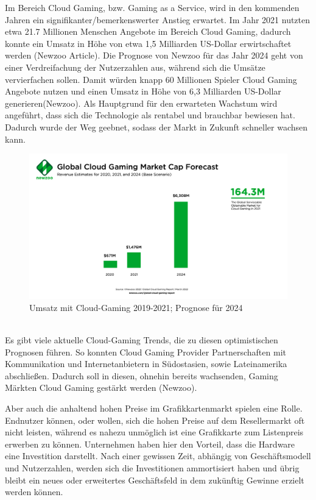\documentclass[12pt,toc=bib,toc=listof]{scrreprt}
\begin{document}
Im Bereich Cloud Gaming, bzw. Gaming as a Service, wird in den kommenden Jahren ein signifikanter/bemerkenswerter
 Anstieg erwartet. Im Jahr 2021 nutzten etwa 21.7 Millionen Menschen Angebote im Bereich Cloud Gaming, dadurch konnte ein
 Umsatz in Höhe von etwa 1,5 Milliarden US-Dollar erwirtschaftet werden (Newzoo Article). Die Prognose von Newzoo für das Jahr 
 2024 geht von einer Verdreifachung der Nutzerzahlen aus, während sich die Umsätze vervierfachen sollen. Damit würden knapp 60
 Millionen Spieler Cloud Gaming Angebote nutzen und einen Umsatz in Höhe von 6,3 Milliarden US-Dollar generieren(Newzoo). Als Hauptgrund für den erwarteten Wachstum wird angeführt, dass sich die Technologie als rentabel und brauchbar bewiesen hat. Dadurch wurde der Weg geebnet, sodass 
 der Markt in Zukunft schneller wachsen kann.
\\%
\begin{figure}[h]
 \centering
  \includegraphics[scale=0.12]{Abbildungen/Newzoo_Global_Cloud_Gaming_Market_Cap_Forecast_March2022.png} 
  \caption[Newzoo]{Umsatz mit Cloud-Gaming 2019-2021; Prognose für 2024}
\end{figure}
\\%

Es gibt viele aktuelle Cloud-Gaming Trends, die zu diesen optimistischen Prognosen führen. So konnten Cloud Gaming Provider 
Partnerschaften mit Kommunikation und Internetanbietern in Südostasien, sowie Lateinamerika abschließen. Dadurch soll in diesen, 
ohnehin bereits wachsenden, Gaming Märkten Cloud Gaming gestärkt werden (Newzoo). 

Aber auch die anhaltend hohen Preise im Grafikkartenmarkt
spielen eine Rolle. Endnutzer können, oder wollen, sich die hohen Preise auf dem Resellermarkt oft nicht leisten, während es nahezu 
unmöglich ist eine Grafikkarte zum Listenpreis erwerben zu können. Unternehmen haben hier den Vorteil, dass die Hardware eine Investition darstellt.
Nach einer gewissen Zeit, abhängig von Geschäftsmodell und Nutzerzahlen, werden sich die Investitionen ammortisiert haben und übrig 
bleibt ein neues oder erweitertes Geschäftsfeld in dem zukünftig Gewinne erzielt werden können.
\end{document}
